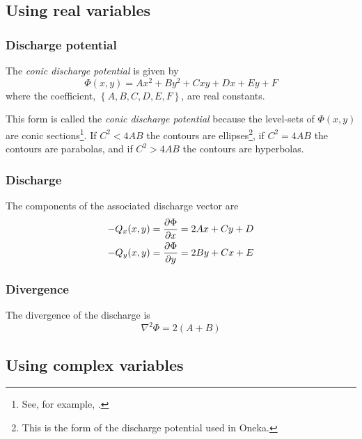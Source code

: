 \documentclass[12pt]{report}
\providecommand{\pderiv}[2]{\frac{\mathinner{\partial#1}}{\mathinner{\partial#2}}}
\begin{document}
\subsection{Using real variables}
\subsubsection{Discharge potential}
The {\em conic discharge potential} is given by
%
\begin{equation} \label{9.0.2}
\boxed{
    \Phi(x,y) = Ax^2 + By^2 + Cxy + Dx + Ey + F
}
\end{equation}
%
where the coefficient, $\left\{ A, B, C, D, E, F \right\}$, are real constants.

This form is called the {\em conic discharge potential} because the level-sets of $\Phi(x,y)$ are conic sections\footnote{See, for example, \citet{wiki:conic}.}.  If $C^2 < 4AB$ the contours are ellipses\footnote{This is the form of the discharge potential used in {Oneka}.}, if $C^2 = 4AB$ the contours are parabolas, and if $C^2 > 4AB$ the contours are hyperbolas.

\subsubsection{Discharge}
The components of the associated discharge vector are
%
\begin{align}
    -Q_x(x,y) &= \pderiv{\Phi}{x} = 2Ax + Cy + D \label{9.0.3}\\
    -Q_y(x,y) &= \pderiv{\Phi}{y} = 2By + Cx + E \label{9.0.4}
\end{align}

\subsubsection{Divergence}
The divergence of the discharge is
%
\begin{equation}\label{9.0.5}
    \nabla^2 \Phi = 2(A+B)
\end{equation}

\subsection{Using complex variables}
\end{document}
